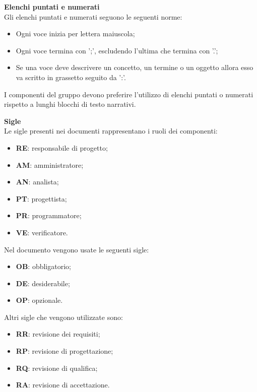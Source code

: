 \mbox{}

\textbf{Elenchi puntati e numerati}\\
Gli elenchi puntati e numerati seguono le seguenti norme:
\begin{itemize}

	\item Ogni voce inizia per lettera maiuscola;
	
	\item Ogni voce termina con ';', escludendo l'ultima che termina con '.';
	
	\item Se una voce deve descrivere un concetto, un termine o un oggetto allora esso va scritto in grassetto seguito da ':'.
\end{itemize}

I componenti del gruppo devono preferire l'utilizzo di elenchi puntati o numerati rispetto a lunghi blocchi di testo narrativi. \\

\mbox{}

\textbf{Sigle}\\
Le sigle presenti nei documenti rappresentano i ruoli dei componenti:
\begin{itemize}

	\item \textbf{RE}: responsabile di progetto;
	
	\item \textbf{AM}: amministratore;
	
	\item \textbf{AN}: analista;
	
	\item \textbf{PT}: progettista;
	
	\item \textbf{PR}: programmatore;
	
	\item \textbf{VE}: verificatore.

\end{itemize}

Nel documento  vengono usate le seguenti sigle:
\begin{itemize}
	\item \textbf{OB}: obbligatorio;
	\item \textbf{DE}: desiderabile;
	\item \textbf{OP}: opzionale.
\end{itemize}

Altri sigle che vengono utilizzate sono:
\begin{itemize}
	\item \textbf{RR}: revisione dei requisiti;
	\item \textbf{RP}: revisione di progettazione;
	\item \textbf{RQ}: revisione di qualifica;
	\item \textbf{RA}: revisione di accettazione.
\end{itemize}

